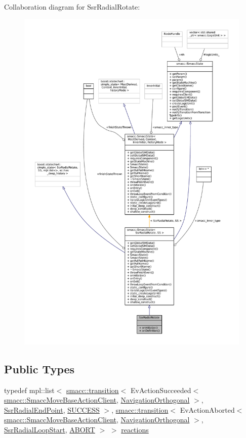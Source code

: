 Collaboration diagram for Ssr\+Radial\+Rotate\+:
\nopagebreak
\begin{figure}[H]
\begin{center}
\leavevmode
\includegraphics[width=350pt]{structSsrRadialRotate__coll__graph}
\end{center}
\end{figure}
\subsection*{Public Types}
\begin{DoxyCompactItemize}
\item 
typedef mpl\+::list$<$ \hyperlink{classsmacc_1_1transition}{smacc\+::transition}$<$ Ev\+Action\+Succeeded$<$ \hyperlink{classsmacc_1_1SmaccMoveBaseActionClient}{smacc\+::\+Smacc\+Move\+Base\+Action\+Client}, \hyperlink{classNavigationOrthogonal}{Navigation\+Orthogonal} $>$, \hyperlink{structSsrRadialEndPoint}{Ssr\+Radial\+End\+Point}, \hyperlink{classSUCCESS}{S\+U\+C\+C\+E\+SS} $>$, \hyperlink{classsmacc_1_1transition}{smacc\+::transition}$<$ Ev\+Action\+Aborted$<$ \hyperlink{classsmacc_1_1SmaccMoveBaseActionClient}{smacc\+::\+Smacc\+Move\+Base\+Action\+Client}, \hyperlink{classNavigationOrthogonal}{Navigation\+Orthogonal} $>$, \hyperlink{structSsrRadialLoopStart}{Ssr\+Radial\+Loop\+Start}, \hyperlink{classABORT}{A\+B\+O\+RT} $>$ $>$ \hyperlink{structSsrRadialRotate_a7470f9e6ce585a02891eb9202e55de9a}{reactions}
\end{DoxyCompactItemize}
